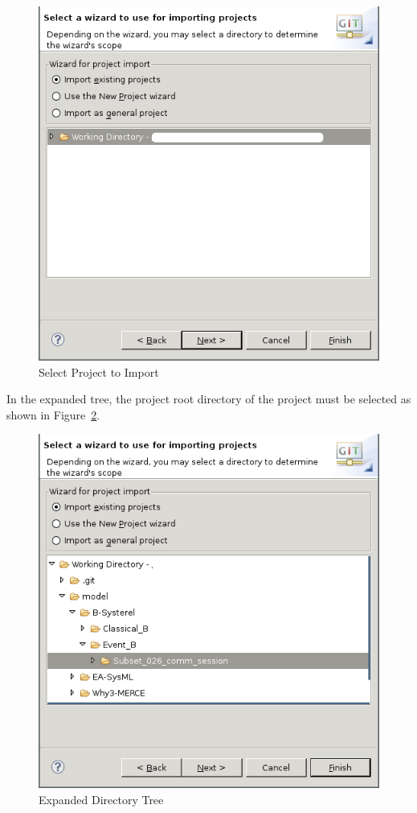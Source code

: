 \documentclass[10pt,a4paper]{article}
\newcommand{\skalierung}{.6}
\begin{document}
\begin{figure}[H]
  \centering
  \includegraphics[width=\skalierung\textwidth]{project_import_step6}
  \caption{Select Project to Import}
  \label{fig:select-project-import}
\end{figure}

In the expanded tree, the project root directory of the project must be selected
as shown in Figure~\ref{fig:expanded-tree}.

\begin{figure}[H]
  \centering
  \includegraphics[width=\skalierung\textwidth]{project_import_step7}
  \caption{Expanded Directory Tree}
  \label{fig:expanded-tree}
\end{figure}
\end{document}
